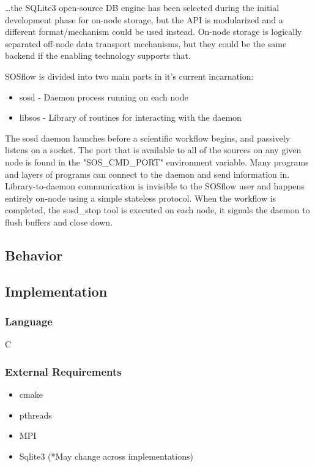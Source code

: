 \ldots the SQLite3 open-source DB engine has been selected during the
initial development phase for on-node storage, but the API is
modularized and a different format/mechanism could be used instead.
On-node storage is logically separated off-node data transport
mechanisms, but they could be the same backend if the enabling
technology supports that.

SOSflow is divided into two main parts in it's current incarnation:

\begin{itemize}
\item sosd - Daemon process running on each node
\item libsos - Library of routines for interacting with the daemon
\end{itemize}

The sosd daemon launches before a scientific workflow begins, and
passively listens on a socket.  The port that is available to all of
the sources on any given node is found in the "SOS\_CMD\_PORT"
environment variable.  Many programs and layers of programs can
connect to the daemon and send information in. Library-to-daemon
communication is invisible to the SOSflow user and happens entirely
on-node using a simple stateless protocol.  When the workflow is
completed, the sosd\_stop tool is executed on each node, it signals
the daemon to flush buffers and close down.

\subsection{Behavior}

\subsection{Implementation}
\subsubsection{Language}C
\subsubsection{External Requirements}

\begin{itemize}
    \item cmake
    \item pthreads
    \item MPI
    \item Sqlite3 (*May change across implementations)
\end{itemize}

